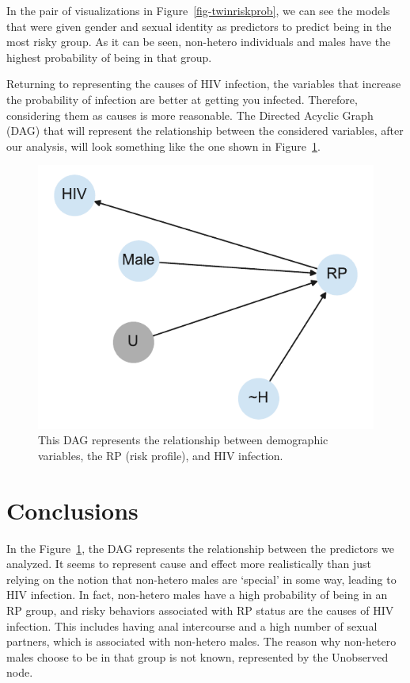 \documentclass[
  12pt,
  letterpaper,
  DIV=11,
  numbers=noendperiod]{scrartcl}
\begin{document}
In the pair of visualizations in Figure~\ref{fig-twinriskprob}, we can
see the models that were given gender and sexual identity as predictors
to predict being in the most risky group. As it can be seen, non-hetero
individuals and males have the highest probability of being in that
group.

Returning to representing the causes of HIV infection, the variables
that increase the probability of infection are better at getting you
infected. Therefore, considering them as causes is more reasonable. The
Directed Acyclic Graph (DAG) that will represent the relationship
between the considered variables, after our analysis, will look
something like the one shown in Figure~\ref{fig-postdag}.

\begin{figure}

{\centering \includegraphics{HIVPaper_files/figure-latex/fig-postdag-output-1.pdf}

}

\caption{\label{fig-postdag}This DAG represents the relationship between
demographic variables, the RP (risk profile), and HIV infection.}

\end{figure}

\hypertarget{conclusions}{%
\section{Conclusions}\label{conclusions}}

In the Figure~\ref{fig-postdag}, the DAG represents the relationship
between the predictors we analyzed. It seems to represent cause and
effect more realistically than just relying on the notion that
non-hetero males are `special' in some way, leading to HIV infection. In
fact, non-hetero males have a high probability of being in an RP group,
and risky behaviors associated with RP status are the causes of HIV
infection. This includes having anal intercourse and a high number of
sexual partners, which is associated with non-hetero males. The reason
why non-hetero males choose to be in that group is not known,
represented by the Unobserved node.
\end{document}
